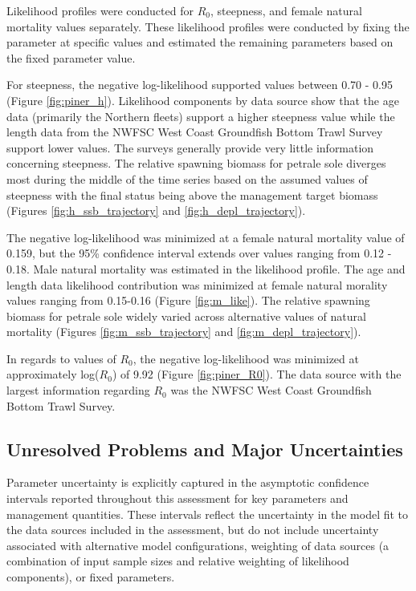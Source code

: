 \documentclass[12pt,]{article}
\begin{document}
Likelihood profiles were conducted for \(R_0\), steepness, and female
natural mortality values separately. These likelihood profiles were
conducted by fixing the parameter at specific values and estimated the
remaining parameters based on the fixed parameter value.

For steepness, the negative log-likelihood supported values between 0.70
- 0.95 (Figure \ref{fig:piner_h}). Likelihood components by data source
show that the age data (primarily the Northern fleets) support a higher
steepness value while the length data from the NWFSC West Coast
Groundfish Bottom Trawl Survey support lower values. The surveys
generally provide very little information concerning steepness. The
relative spawning biomass for petrale sole diverges most during the
middle of the time series based on the assumed values of steepness with
the final status being above the management target biomass (Figures
\ref{fig:h_ssb_trajectory} and \ref{fig:h_depl_trajectory}).

The negative log-likelihood was minimized at a female natural mortality
value of 0.159, but the 95\% confidence interval extends over values
ranging from 0.12 - 0.18. Male natural mortality was estimated in the
likelihood profile. The age and length data likelihood contribution was
minimized at female natural morality values ranging from 0.15-0.16
(Figure \ref{fig:m_like}). The relative spawning biomass for petrale
sole widely varied across alternative values of natural mortality
(Figures \ref{fig:m_ssb_trajectory} and \ref{fig:m_depl_trajectory}).

In regards to values of \(R_0\), the negative log-likelihood was
minimized at approximately log(\(R_0\)) of 9.92 (Figure
\ref{fig:piner_R0}). The data source with the largest information
regarding \(R_0\) was the NWFSC West Coast Groundfish Bottom Trawl
Survey.

\subsection{Unresolved Problems and Major
Uncertainties}\label{unresolved-problems-and-major-uncertainties-1}

Parameter uncertainty is explicitly captured in the asymptotic
confidence intervals reported throughout this assessment for key
parameters and management quantities. These intervals reflect the
uncertainty in the model fit to the data sources included in the
assessment, but do not include uncertainty associated with alternative
model configurations, weighting of data sources (a combination of input
sample sizes and relative weighting of likelihood components), or fixed
parameters.
\end{document}
